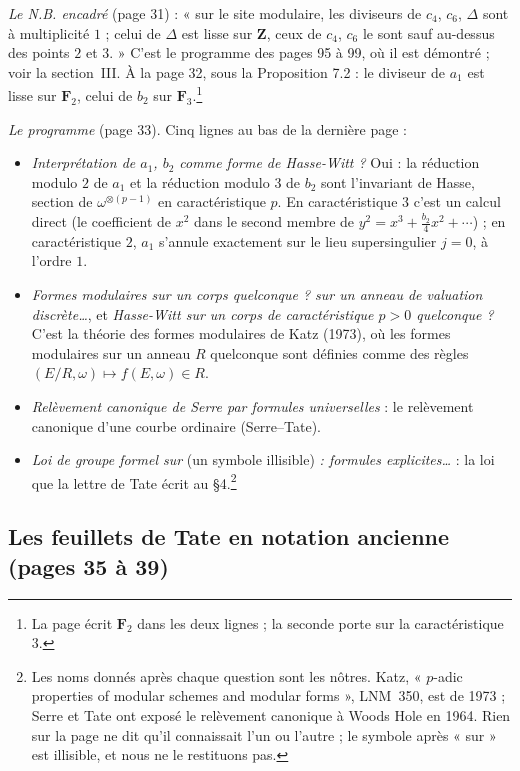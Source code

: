 \documentclass[11pt,a4paper]{article}
\begin{document}
\emph{Le N.B. encadré} (page 31) : « sur le site modulaire, les diviseurs de
$c_4$, $c_6$, $\Delta$ sont à multiplicité $1$ ; celui de $\Delta$ est lisse sur
$\mathbf{Z}$, ceux de $c_4$, $c_6$ le sont sauf au-dessus des points $2$ et
$3$. » C'est le programme des pages 95 à 99, où il est démontré ; voir
la section~III. À la page 32, sous la Proposition 7.2 : le diviseur de $a_1$
est lisse sur $\mathbf{F}_2$, celui de $b_2$ sur $\mathbf{F}_3$.\footnote{La
page écrit $\mathbf{F}_2$ dans les deux lignes ; la seconde porte sur la
caractéristique $3$.}

\emph{Le programme} (page 33). Cinq lignes au bas de la dernière page :
\begin{itemize}
\item \emph{Interprétation de $a_1$, $b_2$ comme forme de Hasse-Witt ?} Oui :
la réduction modulo $2$ de $a_1$ et la réduction modulo $3$ de $b_2$ sont
l'invariant de Hasse, section de $\omega^{\otimes(p-1)}$ en caractéristique
$p$. En caractéristique $3$ c'est un calcul direct (le coefficient de $x^2$
dans le second membre de $y^2 = x^3 + \tfrac{b_2}{4}x^2 + \cdots$) ; en
caractéristique $2$, $a_1$ s'annule exactement sur le lieu supersingulier
$j=0$, à l'ordre $1$.
\item \emph{Formes modulaires sur un corps quelconque ? sur un anneau de
valuation discrète\ldots}, et \emph{Hasse-Witt sur un corps de caractéristique
$p>0$ quelconque ?} C'est la théorie des formes modulaires de Katz
(1973), où les formes modulaires sur un anneau $R$ quelconque sont définies
comme des règles $(E/R,\omega) \mapsto f(E,\omega) \in R$.
\item \emph{Relèvement canonique de Serre par formules universelles} : le
relèvement canonique d'une courbe ordinaire (Serre--Tate).
\item \emph{Loi de groupe formel sur} (un symbole illisible)\emph{ : formules
explicites\ldots} : la loi que la lettre de Tate écrit au §4.\footnote{Les noms donnés après chaque question sont les nôtres. Katz,
« $p$-adic properties of modular schemes and modular forms », LNM~350, est de
1973 ; Serre et Tate ont exposé le relèvement canonique à Woods Hole en 1964.
Rien sur la page ne dit qu'il connaissait l'un ou l'autre ; le symbole après
« sur » est illisible, et nous ne le restituons pas.}
\end{itemize}

\subsection*{Les feuillets de Tate en notation ancienne (pages 35 à 39)}
\end{document}
